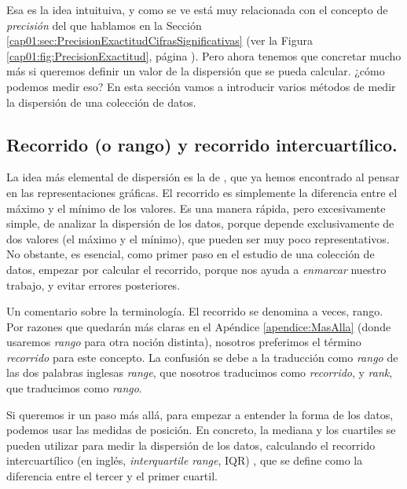 Esa es la idea intuituiva, y como se ve está muy relacionada con el concepto de
{\em precisión} del que hablamos en la Sección
\ref{cap01:sec:PrecisionExactitudCifrasSignificativas} (ver la Figura
\ref{cap01:fig:PrecisionExactitud}, página
\pageref{cap01:fig:PrecisionExactitud}). Pero ahora tenemos que concretar mucho
más si queremos definir un valor de la dispersión que se pueda calcular. ¿cómo
podemos medir eso? En esta sección vamos a introducir varios métodos de medir
la dispersión de una colección de datos.

\subsection{Recorrido (o rango) y recorrido intercuartílico.}
\label{cap02:subsubsec:RangoIntercuartilico}

La idea más elemental de dispersión es la de , que
ya hemos encontrado al pensar en las representaciones gráficas. El recorrido es simplemente la
diferencia entre el máximo y el mínimo de los valores. Es una manera rápida, pero excesivamente
simple, de analizar la dispersión de los datos, porque depende exclusivamente de dos valores (el
máximo y el mínimo), que pueden ser muy poco representativos. No obstante, es esencial, como primer
paso en el estudio de una colección de datos, empezar por calcular el recorrido, porque nos ayuda a
{\em enmarcar} nuestro trabajo, y evitar errores posteriores.

Un comentario sobre la terminología. El recorrido se denomina a veces, {\sf rango}. Por razones que quedarán más claras en el Apéndice \ref{apendice:MasAlla}
(donde usaremos {\em rango} para otra noción distinta), nosotros preferimos el término {\em
recorrido} para este concepto. La confusión se debe a la traducción como {\em rango} de las dos
palabras inglesas {\em range}, que nosotros traducimos como {\em recorrido}, y {\em rank}, que
traducimos como {\em rango}.

Si queremos ir un paso más allá, para empezar a entender la forma de los datos, podemos usar las
medidas de posición. En concreto, la mediana y los cuartiles se pueden utilizar para medir la
dispersión de los datos, calculando el {\sf recorrido intercuartílico} (en inglés, {\em interquartile range}, IQR)  , que se define como la diferencia entre el tercer y el primer cuartil.

